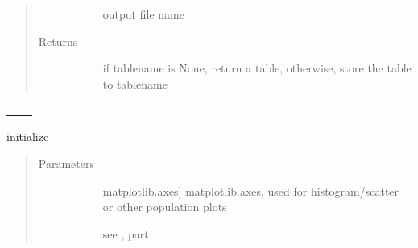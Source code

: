 \documentclass[letterpaper,10pt,english]{sphinxmanual}
\begin{document}
\begin{fulllineitems}
\begin{fulllineitems}
\begin{quote}
\begin{description}
\begin{description}
\item[{}] \leavevmode{[}\sphinxtitleref{str}{]}
output file name

\end{description}

\item[{Returns}] \leavevmode\begin{description}
\item[{}] \leavevmode{[}\sphinxtitleref{str}{]}
if tablename is None, return a table, otherwise, store the table to tablename

\end{description}

\end{description}\end{quote}

\end{fulllineitems}



\begin{savenotes}\sphinxattablestart
\centering
\begin{tabulary}{\linewidth}[t]{|T|T|}
\hline

&\\
\hline
{}
&\\
\hline
{}
&\\
\hline
\end{tabulary}
\par
\sphinxattableend\end{savenotes}

\begin{fulllineitems}
\label{\detokenize{generated/sdapy.snerun.snelist:sdapy.snerun.snelist.__init__}}
initialize 
\begin{quote}\begin{description}
\item[{Parameters}] \leavevmode\begin{description}
\item[{}] \leavevmode{[}matplotlib.axes{]}
matplotlib.axes, used for histogram/scatter or other population plots

\item[{}] \leavevmode{[}\sphinxtitleref{Keyword Arguments}{]}
see ,
 part


\end{description}
\end{description}
\end{quote}
\end{fulllineitems}
\end{fulllineitems}
\end{document}
